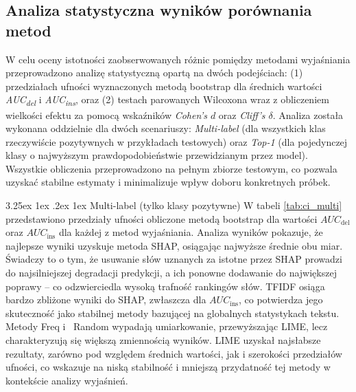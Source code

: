 \documentclass[wmii, inf, mgr]{uwmthesis}
\makeatletter
\renewcommand\paragraph{\@startsection{paragraph}{4}{\z@}%
  {3.25ex \@plus1ex \@minus.2ex}%
  {1ex}%
  {\normalfont\normalsize\bfseries}}
\makeatother
\begin{document}
\subsection{Analiza statystyczna wyników porównania metod}
W celu oceny istotności zaobserwowanych różnic pomiędzy metodami wyjaśniania przeprowadzono analizę statystyczną opartą na dwóch podejściach: (1) przedziałach ufności wyznaczonych metodą bootstrap dla średnich wartości \textit{AUC\textsubscript{del}} i \textit{AUC\textsubscript{ins}}, oraz (2) testach parowanych Wilcoxona wraz z obliczeniem wielkości efektu za pomocą wskaźników \textit{Cohen’s $d$} oraz \textit{Cliff’s $\delta$}. Analiza została wykonana oddzielnie dla dwóch scenariuszy: \textit{Multi-label} (dla wszystkich klas rzeczywiście pozytywnych w przykładach testowych) oraz \textit{Top-1} (dla pojedynczej klasy o najwyższym prawdopodobieństwie przewidzianym przez model). Wszystkie obliczenia przeprowadzono na pełnym zbiorze testowym, co pozwala uzyskać stabilne estymaty i minimalizuje wpływ doboru konkretnych próbek.

\paragraph{Multi-label (tylko klasy pozytywne)}
W tabeli \ref{tab:ci_multi} przedstawiono przedziały ufności obliczone metodą bootstrap dla wartości $AUC_{\text{del}}$ oraz $AUC_{\text{ins}}$ dla każdej z metod wyjaśniania. Analiza wyników pokazuje, że najlepsze wyniki uzyskuje metoda SHAP, osiągając najwyższe średnie obu miar. Świadczy to o tym, że usuwanie słów uznanych za istotne przez SHAP prowadzi do najsilniejszej degradacji predykcji, a ich ponowne dodawanie do największej poprawy -- co odzwierciedla wysoką trafność rankingów słów. TFIDF osiąga bardzo zbliżone wyniki do SHAP, zwłaszcza dla $AUC_{\text{ins}}$, co potwierdza jego skuteczność jako stabilnej metody bazującej na globalnych statystykach tekstu. Metody Freq i~ Random wypadają umiarkowanie, przewyższając LIME, lecz charakteryzują się większą zmiennością wyników. LIME uzyskał najsłabsze rezultaty, zarówno pod względem średnich wartości, jak i szerokości przedziałów ufności, co wskazuje na niską stabilność i mniejszą przydatność tej metody w kontekście analizy wyjaśnień.
\end{document}

